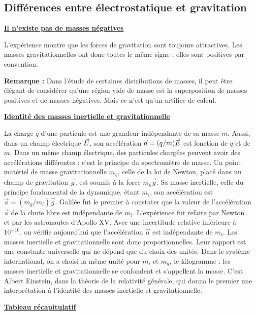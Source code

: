 \documentclass[11pt,a4paper]{article}
\newif\ifinexample
\newcommand{\titr}[1]{\par\ifinexample\else\Needspace{4\baselineskip}\fi\textbf{\underline{#1}}\par\nopagebreak[3]}
\begin{document}
\subsection{Différences entre électrostatique et gravitation}
\titr{Il n'existe pas de masses négatives}
L'expérience montre que les forces de gravitation sont toujours attractives. Les masses gravitationnelles ont donc toutes le même signe ; elles sont positives par convention.
\par\textbf{Remarque :}  Dans l'étude de certaines distributions de masses, il peut être élégant de considérer qu'une région vide de masse est la superposition de masses positives et de masses négatives. Mais ce n'est qu'un artifice de calcul.
\titr{Identité des masses inertielle et gravitationnelle}
La charge $q$ d'une particule est une grandeur indépendante de sa masse $m$. Aussi, dans un champ électrique $\vec E$, son accélération $\vec a=(q/m)\vec E$ est fonction de $q$ et de $m$. Dans un même champ électrique, des particules chargées peuvent avoir des accélérations différentes : c'est le principe du spectromètre de masse.
Un point matériel de masse gravitationnelle $m_g$, celle de la loi de Newton, placé dans un champ de gravitation $\vec g$, est soumis à la force $m_g\vec g$. Sa masse inertielle, celle du principe fondamental de la dynamique, étant $m_i$, son accélération est $\vec a=(m_g/m_i)\vec g$.
Galilée fut le premier à constater que la valeur de l'accélération $\vec a$ de la chute libre est indépendante de $m_i$. L'expérience fut refaite par Newton et par les astronautes d'Apollo XV. Avec une incertitude relative inférieure à $10^{-10}$, on vérifie aujourd'hui que l'accélération $\vec a$ est indépendante de $m_i$. Les masses inertielle et gravitationnelle sont donc proportionnelles. Leur rapport est une constante universelle qui ne dépend que du choix des unités. Dans le système international, on a choisi la même unité pour $m_i$ et $m_g$, le kilogramme : les masses inertielle et gravitationnelle se confondent et s'appellent la masse.
C'est Albert Einstein, dans la théorie de la relativité générale, qui donna le premier une interprétation à l'identité des masses inertielle et gravitationnelle.
\titr{Tableau récapitulatif}
\begingroup\small\renewcommand{\arraystretch}{1.9}\setlength{\extrarowheight}{5pt}\setlength{\tabcolsep}{9pt}
\end{document}
